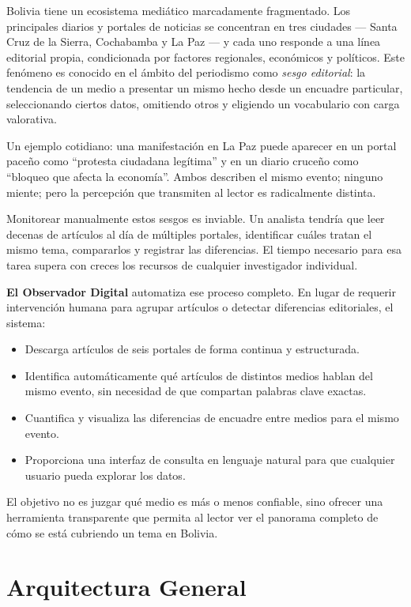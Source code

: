 \documentclass[12pt,a4paper]{article}
\begin{document}
Bolivia tiene un ecosistema mediático marcadamente fragmentado. Los principales diarios y portales de noticias se concentran en tres ciudades --- Santa Cruz de la Sierra, Cochabamba y La Paz --- y cada uno responde a una línea editorial propia, condicionada por factores regionales, económicos y políticos. Este fenómeno es conocido en el ámbito del periodismo como \textit{sesgo editorial}: la tendencia de un medio a presentar un mismo hecho desde un encuadre particular, seleccionando ciertos datos, omitiendo otros y eligiendo un vocabulario con carga valorativa.

Un ejemplo cotidiano: una manifestación en La Paz puede aparecer en un portal paceño como ``protesta ciudadana legítima'' y en un diario cruceño como ``bloqueo que afecta la economía''. Ambos describen el mismo evento; ninguno miente; pero la percepción que transmiten al lector es radicalmente distinta.

Monitorear manualmente estos sesgos es inviable. Un analista tendría que leer decenas de artículos al día de múltiples portales, identificar cuáles tratan el mismo tema, compararlos y registrar las diferencias. El tiempo necesario para esa tarea supera con creces los recursos de cualquier investigador individual.

\textbf{El Observador Digital} automatiza ese proceso completo. En lugar de requerir intervención humana para agrupar artículos o detectar diferencias editoriales, el sistema:

\begin{itemize}[nosep]
  \item Descarga artículos de seis portales de forma continua y estructurada.
  \item Identifica automáticamente qué artículos de distintos medios hablan del mismo evento, sin necesidad de que compartan palabras clave exactas.
  \item Cuantifica y visualiza las diferencias de encuadre entre medios para el mismo evento.
  \item Proporciona una interfaz de consulta en lenguaje natural para que cualquier usuario pueda explorar los datos.
\end{itemize}

El objetivo no es juzgar qué medio es más o menos confiable, sino ofrecer una herramienta transparente que permita al lector ver el panorama completo de cómo se está cubriendo un tema en Bolivia.

\section{Arquitectura General}
\end{document}
